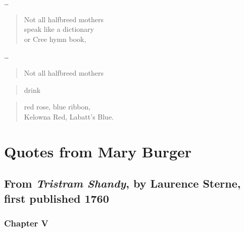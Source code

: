 \documentclass[
]{memoir}
\begin{document}
\ldots{}

\begin{verse}
Not all halfbreed mothers\\
speak like a dictionary\\
or Cree hymn book,\\
\end{verse}

\ldots{}

\begin{verse}
Not all halfbreed mothers\\
\end{verse}

\begin{verse}
drink\\
\end{verse}

\begin{verse}
red rose, blue ribbon,\\
Kelowna Red, Labatt's Blue.\\
\end{verse}

\hypertarget{quotes-from-mary-burger}{%
\section*{Quotes from Mary Burger}\label{quotes-from-mary-burger}}

\hypertarget{from-tristram-shandy-by-laurence-sterne-first-published-1760}{%
\subsection*{\texorpdfstring{From \emph{Tristram Shandy}, by Laurence
Sterne, first published
1760}{From Tristram Shandy, by Laurence Sterne, first published 1760}}\label{from-tristram-shandy-by-laurence-sterne-first-published-1760}}

\hypertarget{chapter-v}{%
\subsubsection*{Chapter V}\label{chapter-v}}
\end{document}
